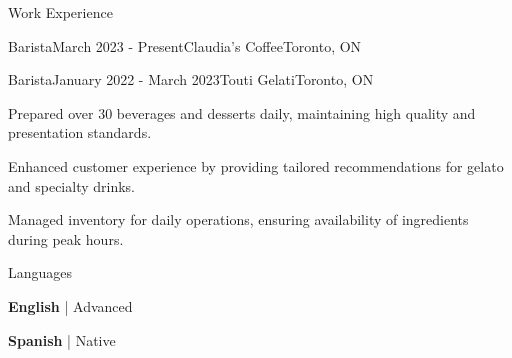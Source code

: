 \documentclass[11pt]{resume} %
\begin{document}
\begin{rSection}{Work Experience}

	\begin{rSubsection}{Barista}{March 2023 - Present}{Claudia's Coffee}{Toronto, ON}

	\end{rSubsection}


	\begin{rSubsection}{Barista}{January 2022 - March 2023}{Touti Gelati}{Toronto, ON}
		\item Prepared over 30 beverages and desserts daily, maintaining high quality and presentation standards.
		\item Enhanced customer experience by providing tailored recommendations for gelato and specialty drinks.
		\item Managed inventory for daily operations, ensuring availability of ingredients during peak hours.
	\end{rSubsection}


\end{rSection}


\begin{rSection}{Languages}
	\begin{rSubsection}{}{}{}{}
		\item \textbf{English} | Advanced
		\item \textbf{Spanish} | Native
	\end{rSubsection}
\end{rSection}

\end{document}
